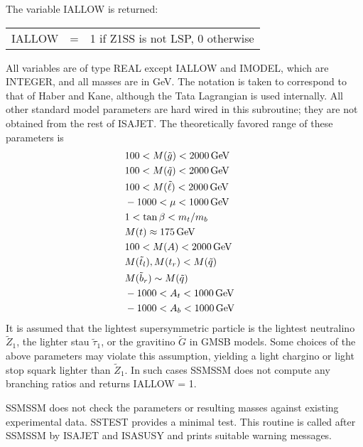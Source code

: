 \noindent The variable IALLOW is returned:

\smallskip\noindent
\begin{tabular}{lcl}
      IALLOW &=& 1 if Z1SS is not LSP, 0 otherwise\\
\end{tabular}
\smallskip

\noindent All variables are of type REAL except IALLOW and IMODEL, which
are INTEGER, and all masses are in GeV. The notation is taken to
correspond to that of Haber and Kane, although the Tata Lagrangian is
used internally. All other standard model parameters are hard wired in
this subroutine; they are not obtained from the rest of ISAJET. The
theoretically favored range of these parameters is
\begin{eqnarray*}
& 100 < M(\tilde g) < 2000\,{\rm GeV} &\\
& 100 < M(\tilde q) < 2000\,{\rm GeV} &\\
& 100 < M(\tilde\ell) < 2000\,{\rm GeV} &\\
& -1000 < \mu < 1000\,{\rm GeV} &\\
& 1 < \tan\beta < m_t/m_b &\\
& M(t) \approx 175\,{\rm GeV} &\\
& 100 < M(A) < 2000\,{\rm GeV} &\\
& M(\tilde t_l), M(t_r) < M(\tilde q) &\\
& M(\tilde b_r) \sim M(\tilde q) &\\
& -1000 < A_t < 1000\,{\rm GeV} &\\
& -1000 < A_b < 1000\,{\rm GeV} &
\end{eqnarray*}
It is assumed that the lightest supersymmetric particle is the lightest
neutralino $\tilde Z_1$, the lighter stau $\tilde\tau_1$, or the
gravitino $\tilde G$ in GMSB models. Some choices of the above
parameters may violate this assumption, yielding a light chargino or
light stop squark lighter than $\tilde Z_1$. In such cases SSMSSM does
not compute any branching ratios and returns IALLOW = 1.

      SSMSSM does not check the parameters or resulting masses against
existing experimental data. SSTEST provides a minimal test. This routine
is called after SSMSSM by ISAJET and ISASUSY and prints suitable warning
messages.

